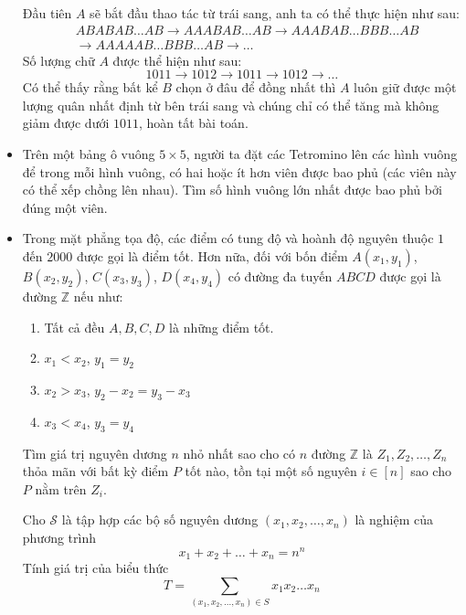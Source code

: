 \documentclass[11pt]{scrartcl}
\begin{document}
\begin{itemize}[label=, leftmargin=0em, itemsep=0.5em]
\begin{sol}
        Đầu tiên $A$ sẽ bắt đầu thao tác từ trái sang, anh ta có thể thực hiện như sau:
        \[
            \begin{aligned}
                &ABABAB\dots AB \to AAABAB\dots AB \to AAABAB\dots BBB\dots AB\\
                &\to AAAAAB\dots BBB \dots AB \to \dots
            \end{aligned}
        \]
        Số lượng chữ $A$ được thể hiện như sau:
        \[
            1011 \to 1012 \to 1011 \to 1012 \to\dots
        \]
        Có thể thấy rằng bất kể $B$ chọn ở đâu để đồng nhất thì $A$ luôn giữ được một lượng quân nhất định từ bên trái sang và chúng chỉ có thể tăng mà không giảm được dưới $1011$, hoàn tất bài toán.
    \end{sol}

    \item \begin{btvn}
        Trên một bảng ô vuông $5 \times 5$, người ta đặt các Tetromino
        lên các hình vuông để trong mỗi hình vuông, có hai hoặc ít hơn viên được bao phủ (các viên này có thể xếp chồng lên nhau). Tìm số hình vuông lớn nhất được bao phủ bởi đúng một viên.
    \end{btvn}


    \item \begin{btvn}
    Trong mặt phẳng tọa độ, các điểm có tung độ và hoành độ nguyên thuộc $1$ đến $2000$ được gọi là điểm tốt. Hơn nữa, đối với bốn điểm $A(x_1, y_1)$, $B(x_2, y_2)$, $C(x_3, y_3)$, $D(x_4, y_4)$ có đường đa tuyến $ABCD$ được gọi là đường $\mathbb{Z}$ nếu như:
    \begin{enumerate}
        \item Tất cả đều $A, B, C, D$ là những điểm tốt.
        \item  $x_1<x_2$, $y_1=y_2$
        \item $x_2>x_3$, $y_2-x_2=y_3-x_3$
        \item $x_3<x_4$, $y_3=y_4$
    \end{enumerate}
    
    Tìm giá trị nguyên dương $n$ nhỏ nhất sao cho có $n$ đường $\mathbb{Z}$ là $Z_1, Z_2,\dots, Z_n$ thỏa mãn với bất kỳ điểm $P$ tốt nào, tồn tại một số nguyên $i \in [n]$ sao cho $P$ nằm trên $Z_i$.
        
    \end{btvn}
    \begin{bt}
        Cho $\mathcal{S}$ là tập hợp các bộ số nguyên dương $(x_1,x_2,\dots,x_n)$ là nghiệm của phương trình
    \[
        x_1 + x_2 +\dots+x_n = n^n
    \]
    Tính giá trị của biểu thức
    \[
        T=\sum_{(x_1,x_2,\dots,x_n) \in S}x_1x_2\dots x_n 
    \]
    \end{bt}



\end{itemize}
\end{document}
